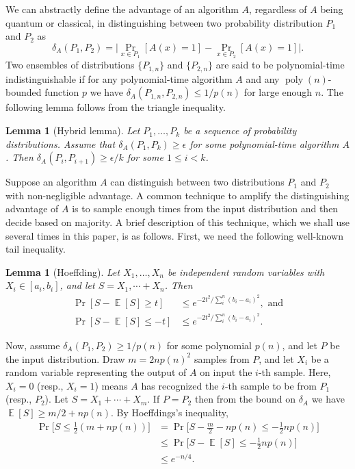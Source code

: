 \documentclass[11pt]{article}
\theoremstyle{plain}
\newtheorem{lemma}[theorem]{Lemma}
\theoremstyle{definition}
\DeclareMathOperator{\poly}{poly}
\DeclareMathOperator{\E}{\mathbb{E}}
\begin{document}
We can abstractly define the advantage of an algorithm $A$, regardless of $A$ being quantum or classical, in distinguishing between two probability distribution $P_1$ and $P_2$ as
\[ \delta_A(P_1, P_2) = \Big| \Pr_{x \in P_1}[A(x) = 1] - \Pr_{x \in P_2}[A(x) = 1] \Big|. \]
Two ensembles of distributions $\{ P_{1, n} \}$ and $\{ P_{2, n} \}$ are said to be polynomial-time indistinguishable if for any polynomial-time algorithm $A$ and any $\poly(n)$-bounded function $p$ we have $\delta_A(P_{1, n}, P_{2, n}) \le 1 / p(n)$ for large enough $n$. The following lemma follows from the triangle inequality.
\begin{lemma}[Hybrid lemma]
    \label{lem:hybrid}
    Let $P_1, \dots, P_k$ be a sequence of probability distributions. Assume that $\delta_A(P_1, P_k) \ge \epsilon$ for some polynomial-time algorithm $A$. Then $\delta_A(P_i, P_{i + 1}) \ge \epsilon / k$ for some $1 \le i < k$.
\end{lemma}
Suppose an algorithm $A$ can distinguish between two distributions $P_1$ and $P_2$ with non-negligible advantage. A common technique to amplify the distinguishing advantage of $A$ is to sample enough times from the input distribution and then decide based on majority. A brief description of this technique, which we shall use several times in this paper, is as follows. First, we need the following well-known tail inequality.
\begin{lemma}[Hoeffding]
    \label{lem:hoeffding}
    Let $X_1, \dots, X_n$ be independent random variables with $X_i \in [a_i, b_i]$, and let $S = X_1, \cdots + X_n$. Then
    \begin{align*}
        \Pr[S - \E[S] \ge t] & \le e^{-2t^2 / \sum_i^n (b_i - a_i)^2}, \text{ and} \\
        \Pr[S - \E[S] \le -t] & \le e^{-2t^2 / \sum_i^n (b_i - a_i)^2}.
    \end{align*}
\end{lemma}
Now, assume $\delta_A(P_1, P_2) \ge 1 / p(n)$ for some polynomial $p(n)$, and let $P$ be the input distribution. Draw $m = 2np(n)^2$ samples from $P$, and let $X_i$ be a random variable representing the output of $A$ on input the $i$-th sample. Here, $X_i = 0$ (resp., $X_i = 1$) means $A$ has recognized the $i$-th sample to be from $P_1$ (resp., $P_2$). Let $S = X_1 + \cdots + X_m$. If $P = P_2$ then from the bound on $\delta_A$ we have $\E[S] \ge m / 2 + np(n)$. By Hoeffdings's inequality,
\begin{align*}
    \Pr\Big[ S \le \frac{1}{2} (m + np(n)) \Big]
    & = \Pr\Big[ S - \frac{m}{2} - np(n) \le -\frac{1}{2}np(n) \Big] \\
    & \le \Pr\Big[ S - \E[S] \le -\frac{1}{2}np(n) \Big] \\
    & \le e^{-n / 4}.
\end{align*}
\end{document}

